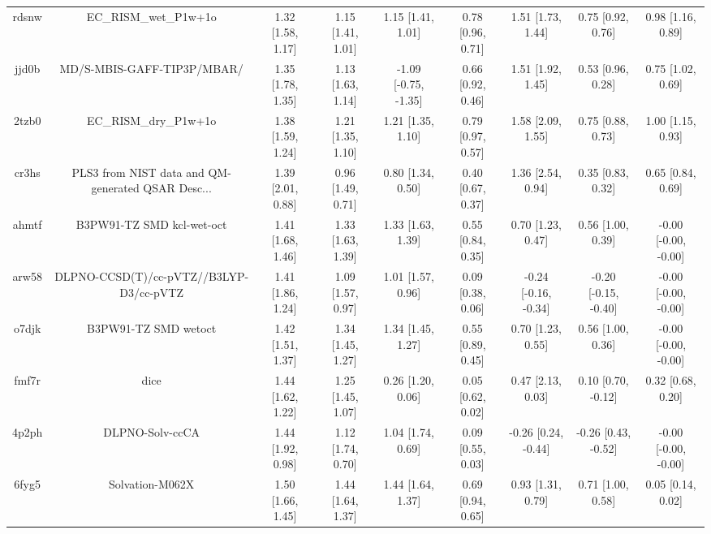 \documentclass{article}
\begin{document}
\begin{center}
\begin{longtable}{|ccccccccc|}
 rdsnw &                              EC\_RISM\_wet\_P1w+1o &  1.32 [1.58, 1.17] &  1.15 [1.41, 1.01] &     1.15 [1.41, 1.01] &  0.78 [0.96, 0.71] &     1.51 [1.73, 1.44] &     0.75 [0.92, 0.76] &     0.98 [1.16, 0.89] \\
 jjd0b &                         MD/S-MBIS-GAFF-TIP3P/MBAR/ &  1.35 [1.78, 1.35] &  1.13 [1.63, 1.14] &  -1.09 [-0.75, -1.35] &  0.66 [0.92, 0.46] &     1.51 [1.92, 1.45] &     0.53 [0.96, 0.28] &     0.75 [1.02, 0.69] \\
 2tzb0 &                              EC\_RISM\_dry\_P1w+1o &  1.38 [1.59, 1.24] &  1.21 [1.35, 1.10] &     1.21 [1.35, 1.10] &  0.79 [0.97, 0.57] &     1.58 [2.09, 1.55] &     0.75 [0.88, 0.73] &     1.00 [1.15, 0.93] \\
 cr3hs &  PLS3 from NIST data and QM-generated QSAR Desc... &  1.39 [2.01, 0.88] &  0.96 [1.49, 0.71] &     0.80 [1.34, 0.50] &  0.40 [0.67, 0.37] &     1.36 [2.54, 0.94] &     0.35 [0.83, 0.32] &     0.65 [0.84, 0.69] \\
 ahmtf &                          B3PW91-TZ SMD kcl-wet-oct &  1.41 [1.68, 1.46] &  1.33 [1.63, 1.39] &     1.33 [1.63, 1.39] &  0.55 [0.84, 0.35] &     0.70 [1.23, 0.47] &     0.56 [1.00, 0.39] &  -0.00 [-0.00, -0.00] \\
 arw58 &            DLPNO-CCSD(T)/cc-pVTZ//B3LYP-D3/cc-pVTZ &  1.41 [1.86, 1.24] &  1.09 [1.57, 0.97] &     1.01 [1.57, 0.96] &  0.09 [0.38, 0.06] &  -0.24 [-0.16, -0.34] &  -0.20 [-0.15, -0.40] &  -0.00 [-0.00, -0.00] \\
 o7djk &                               B3PW91-TZ SMD wetoct &  1.42 [1.51, 1.37] &  1.34 [1.45, 1.27] &     1.34 [1.45, 1.27] &  0.55 [0.89, 0.45] &     0.70 [1.23, 0.55] &     0.56 [1.00, 0.36] &  -0.00 [-0.00, -0.00] \\
 fmf7r &                                               dice &  1.44 [1.62, 1.22] &  1.25 [1.45, 1.07] &     0.26 [1.20, 0.06] &  0.05 [0.62, 0.02] &     0.47 [2.13, 0.03] &    0.10 [0.70, -0.12] &     0.32 [0.68, 0.20] \\
 4p2ph &                                    DLPNO-Solv-ccCA &  1.44 [1.92, 0.98] &  1.12 [1.74, 0.70] &     1.04 [1.74, 0.69] &  0.09 [0.55, 0.03] &   -0.26 [0.24, -0.44] &   -0.26 [0.43, -0.52] &  -0.00 [-0.00, -0.00] \\
 6fyg5 &                                    Solvation-M062X &  1.50 [1.66, 1.45] &  1.44 [1.64, 1.37] &     1.44 [1.64, 1.37] &  0.69 [0.94, 0.65] &     0.93 [1.31, 0.79] &     0.71 [1.00, 0.58] &     0.05 [0.14, 0.02] \\

\end{longtable}
\end{center}
\end{document}
